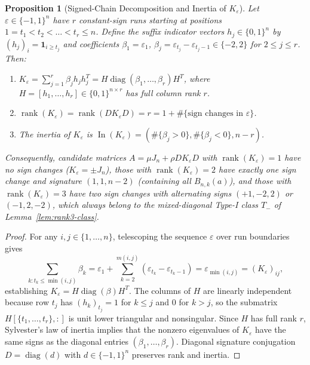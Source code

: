 \documentclass[11pt,reqno]{article}
\newtheorem{proposition}[theorem]{Proposition}
\theoremstyle{definition}
\newcommand{\diag}{\operatorname{diag}}
\newcommand{\rank}{\operatorname{rank}}
\begin{document}
\begin{proposition}[Signed-Chain Decomposition and Inertia of $K_\varepsilon$]\label{prop:signed-chain}
Let $\varepsilon \in \{-1, 1\}^n$ have $r$ constant-sign runs starting at positions $1 = t_1 < t_2 < \dots < t_r \le n$. Define the suffix indicator vectors $h_j \in \{0, 1\}^n$ by $(h_j)_i = \mathbf{1}_{i \ge t_j}$ and coefficients $\beta_1 = \varepsilon_1$, $\beta_j = \varepsilon_{t_j} - \varepsilon_{t_j - 1} \in \{-2, 2\}$ for $2 \le j \le r$. Then:
\begin{enumerate}
    \item $K_\varepsilon = \sum_{j=1}^r \beta_j h_j h_j^T = H \diag(\beta_1, \dots, \beta_r) H^T$, where $H = [h_1, \dots, h_r] \in \{0, 1\}^{n \times r}$ has full column rank $r$.
    \item $\rank(K_\varepsilon) = \rank(D K_\varepsilon D) = r = 1 + \#\{\text{sign changes in } \varepsilon\}$.
    \item The inertia of $K_\varepsilon$ is $\operatorname{In}(K_\varepsilon) = (\#\{\beta_j > 0\}, \#\{\beta_j < 0\}, n - r)$.
\end{enumerate}
Consequently, candidate matrices $A = \mu J_n + \rho D K_\varepsilon D$ with $\rank(K_\varepsilon) = 1$ have no sign changes ($K_\varepsilon = \pm J_n$), those with $\rank(K_\varepsilon) = 2$ have exactly one sign change and signature $(1, 1, n-2)$ (containing all $B_{n, k}(a)$), and those with $\rank(K_\varepsilon) = 3$ have two sign changes with alternating signs $(+1, -2, 2)$ or $(-1, 2, -2)$, which always belong to the mixed-diagonal Type-I class $T_-$ of Lemma~\ref{lem:rank3-class}.
\end{proposition}
\begin{proof}
For any $i, j \in \{1, \dots, n\}$, telescoping the sequence $\varepsilon$ over run boundaries gives
\[
\sum_{k : t_k \le \min(i, j)} \beta_k = \varepsilon_1 + \sum_{k=2}^{m(i, j)} (\varepsilon_{t_k} - \varepsilon_{t_k - 1}) = \varepsilon_{\min(i, j)} = (K_\varepsilon)_{ij},
\]
establishing $K_\varepsilon = H \diag(\beta) H^T$. The columns of $H$ are linearly independent because row $t_j$ has $(h_k)_{t_j} = 1$ for $k \le j$ and $0$ for $k > j$, so the submatrix $H[\{t_1, \dots, t_r\}, :]$ is unit lower triangular and nonsingular. Since $H$ has full rank $r$, Sylvester's law of inertia implies that the nonzero eigenvalues of $K_\varepsilon$ have the same signs as the diagonal entries $(\beta_1, \dots, \beta_r)$. Diagonal signature conjugation $D = \diag(d)$ with $d \in \{-1, 1\}^n$ preserves rank and inertia.
\end{proof}
\end{document}
